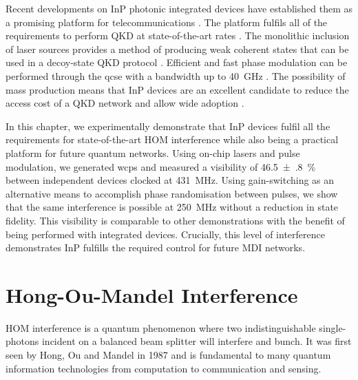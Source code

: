Recent developments on \ac{InP} photonic integrated devices have established them as a promising platform for telecommunications \cite{smit2014}. The platform fulfils all of the requirements to perform \ac{QKD} at state-of-the-art rates \cite{Sibson2017InP}. The monolithic inclusion of laser sources provides a method of producing weak coherent states that can be used in a decoy-state QKD protocol \cite{Lo2005}. Efficient and fast phase modulation can be performed through the \ac{qcse} with a bandwidth up to \SI{40}{GHz} \cite{smit2014}. The possibility of mass production means that \ac{InP} devices are an excellent candidate to reduce the access cost of a \ac{QKD} network and allow wide adoption \cite{JeppixRoadmap}.

In this chapter, we experimentally demonstrate that \ac{InP} devices fulfil all the requirements for state-of-the-art \ac{HOM} interference while also being a practical platform for future quantum networks. Using on-chip lasers and pulse modulation, we generated \acp{wcp} and measured a visibility of \SI{46.5(8)}{\percent} between independent devices clocked at \SI{431}{MHz}. Using gain-switching as an alternative means to accomplish phase randomisation between pulses, we show that the same interference is possible at \SI{250}{MHz} without a reduction in state fidelity. This visibility is comparable to other demonstrations \cite{Yuan2014, Rubenok2013, Comandar2016} with the benefit of being performed with integrated devices. Crucially, this level of interference demonstrates \ac{InP} fulfills the required control for future \ac{MDI} networks.


\section{Hong-Ou-Mandel Interference}

\Ac{HOM} interference is a quantum phenomenon where two indistinguishable single-photons incident on a balanced beam splitter will interfere and bunch. It was first seen by Hong, Ou and Mandel in 1987 \cite{HOM} and is fundamental to many quantum information technologies from computation to communication and sensing. 

